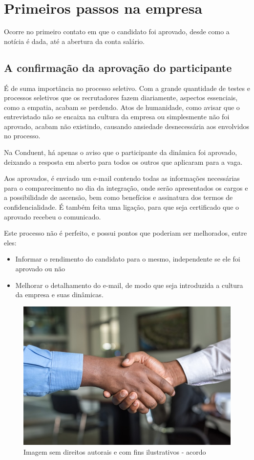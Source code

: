 \documentclass[12pt]{article}
\begin{document}
\newpage


\section{Primeiros passos na empresa}
Ocorre no primeiro contato em que o candidato foi aprovado, desde como a notícia é dada, até a abertura da conta salário.


\subsection{A confirmação da aprovação do participante}
É de suma importância no processo seletivo. Com a grande quantidade de testes e processos seletivos que os recrutadores fazem diariamente, aspectos essenciais, como a empatia, acabam se perdendo. Atos de humanidade, como avisar que o entrevistado não se encaixa na cultura da empresa ou simplesmente não foi aprovado, acabam não existindo, causando ansiedade desnecessária aos envolvidos no processo.

Na Conduent, há apenas o aviso que o participante da dinâmica foi aprovado, deixando a resposta em aberto para todos os outros que aplicaram para a vaga.

Aos aprovados, é enviado um e-mail contendo todas as informações necessárias para o comparecimento no dia da integração, onde serão apresentados os cargos e a possibilidade de ascensão, bem como benefícios e assinatura dos termos de confidencialidade. É também feita uma ligação, para que seja certificado que o aprovado recebeu o comunicado.

Este processo não é perfeito, e possui pontos que poderiam ser melhorados, entre eles:

\begin{itemize}
\item Informar o rendimento do candidato para o mesmo, independente se ele foi aprovado ou não
\item  Melhorar o detalhamento do e-mail, de modo que seja introduzida a cultura da empresa e suas dinâmicas.
\end{itemize}

\begin{figure}[h]
	\centering
	\includegraphics[scale=0.4]{build/images/maos.jpg}
	\caption{Imagem sem direitos autorais e com fins ilustrativos - acordo}
	\label{fig:mesh1}
\end{figure}
\end{document}
